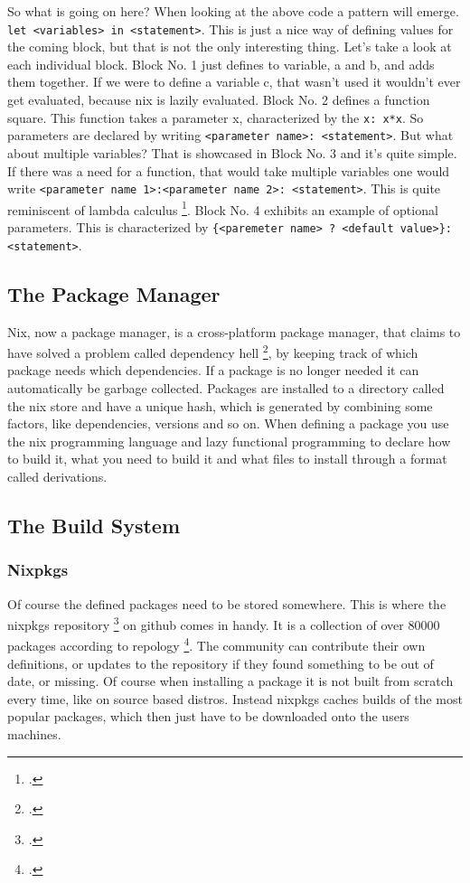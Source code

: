 So what is going on here? When looking at the above code a pattern will emerge. \newline \verb+let <variables> in <statement>+. This is just a nice way of defining values for the coming block, but that is not the only interesting thing. 
Let's take a look at each individual block. Block No. 1 just defines to variable, a and b, and adds them together. If we were to define a variable c, that wasn't used it wouldn't ever get evaluated, because nix is lazily evaluated.
Block No. 2 defines a function square. This function takes a parameter x, characterized by the \verb+x: x*x+. So parameters are declared by writing \newline \verb+<parameter name>: <statement>+. But what about multiple variables? That is showcased in Block No. 3
and it's quite simple. If there was a need for a function, that would take multiple variables one would write \newline \verb+<parameter name 1>:<parameter name 2>: <statement>+. This is quite reminiscent of lambda calculus \footcite{lambda_calculus}.
Block No. 4 exhibits an example of optional parameters. This is characterized by \newline \verb+{<paremeter name> ? <default value>}: <statement>+.


\subsection{The Package Manager}
Nix, now a package manager, is a cross-platform package manager, that claims to have solved a problem called dependency hell \footcite{dependency_hell}, by keeping track of which package needs which dependencies. If a package is no longer needed it can automatically be garbage collected. Packages are installed to a directory called the nix store and have a unique hash, which is generated by combining some factors, like dependencies, versions and so on. 
When defining a package you use the nix programming language and lazy functional programming to declare how to build it, what you need to build it and what files to install through a format called derivations.
 
\subsection{The Build System}


\subsubsection{Nixpkgs}
Of course the defined packages need to be stored somewhere. This is where the nixpkgs repository \footcite{nixpkgs_repo} on github comes in handy. It is a collection of over 80000 packages according to repology \footcite{repology_nixpkgs}. 
The community can contribute their own definitions, or updates to the repository if they found something to be out of date, or missing. Of course when installing a package it is not built from scratch every time, like on source based distros.
Instead nixpkgs caches builds of the most popular packages, which then just have to be downloaded onto the users machines. 
  


